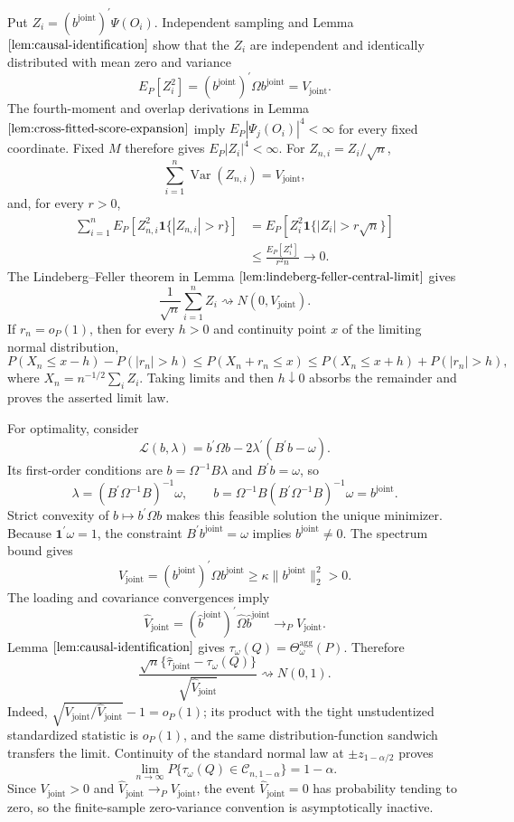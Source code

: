 Put \(Z_i=(b^{\mathrm{joint}})^{\prime}\Psi(O_i)\). Independent sampling and Lemma \(\ref{lem:causal-identification}\) show that the \(Z_i\) are independent and identically distributed with mean zero and variance
\[
 E_P[Z_i^2]=(b^{\mathrm{joint}})^{\prime}\Omega
 b^{\mathrm{joint}}=V_{\mathrm{joint}}.
\]
The fourth-moment and overlap derivations in Lemma \(\ref{lem:cross-fitted-score-expansion}\) imply \(E_P|\Psi_j(O_i)|^4<\infty\) for every fixed coordinate. Fixed \(M\) therefore gives \(E_P|Z_i|^4<\infty\). For \(Z_{n,i}=Z_i/\sqrt n\),
\[
 \sum_{i=1}^n\operatorname{Var}(Z_{n,i})=V_{\mathrm{joint}},
\]
and, for every \(r>0\),
\[
\begin{aligned}
 \sum_{i=1}^nE_P[Z_{n,i}^2\mathbf 1\{|Z_{n,i}|>r\}]
 &=E_P[Z_i^2\mathbf 1\{|Z_i|>r\sqrt n\}]\\
 &\le \frac{E_P[Z_i^4]}{r^2n}\longrightarrow0.
\end{aligned}
\]
The Lindeberg--Feller theorem in Lemma \(\ref{lem:lindeberg-feller-central-limit}\) gives
\[
 \frac1{\sqrt n}\sum_{i=1}^nZ_i
 \rightsquigarrow N(0,V_{\mathrm{joint}}).
\]
If \(r_n=o_P(1)\), then for every \(h>0\) and continuity point \(x\) of the limiting normal distribution,
\[
 P(X_n\le x-h)-P(|r_n|>h)
 \le P(X_n+r_n\le x)
 \le P(X_n\le x+h)+P(|r_n|>h),
\]
where \(X_n=n^{-1/2}\sum_iZ_i\). Taking limits and then \(h\downarrow0\) absorbs the remainder and proves the asserted limit law.

For optimality, consider
\[
 \mathcal L(b,\lambda)=b^{\prime}\Omega b
 -2\lambda^{\prime}(B^{\prime}b-\omega).
\]
Its first-order conditions are \(b=\Omega^{-1}B\lambda\) and \(B^{\prime}b=\omega\), so
\[
 \lambda=(B^{\prime}\Omega^{-1}B)^{-1}\omega,
 \qquad
 b=\Omega^{-1}B(B^{\prime}\Omega^{-1}B)^{-1}\omega
 =b^{\mathrm{joint}}.
\]
Strict convexity of \(b\mapsto b^{\prime}\Omega b\) makes this feasible solution the unique minimizer. Because \(\mathbf 1^{\prime}\omega=1\), the constraint \(B^{\prime}b^{\mathrm{joint}}=\omega\) implies \(b^{\mathrm{joint}}\ne0\). The spectrum bound gives
\[
 V_{\mathrm{joint}}
 =(b^{\mathrm{joint}})^{\prime}\Omega b^{\mathrm{joint}}
 \ge\kappa\|b^{\mathrm{joint}}\|_2^2>0.
\]
The loading and covariance convergences imply
\[
 \widehat V_{\mathrm{joint}}
 =(\widehat b^{\mathrm{joint}})^{\prime}
 \widehat\Omega\widehat b^{\mathrm{joint}}
 \to_PV_{\mathrm{joint}}.
\]
Lemma \(\ref{lem:causal-identification}\) gives \(\tau_\omega(Q)=\Theta_\omega^{\mathrm{agg}}(P)\). Therefore
\[
 \frac{\sqrt n\{\widehat\tau_{\mathrm{joint}}-\tau_\omega(Q)\}}
 {\sqrt{\widehat V_{\mathrm{joint}}}}
 \rightsquigarrow N(0,1).
\]
Indeed, \(\sqrt{V_{\mathrm{joint}}/\widehat V_{\mathrm{joint}}}-1=o_P(1)\); its product with the tight unstudentized standardized statistic is \(o_P(1)\), and the same distribution-function sandwich transfers the limit. Continuity of the standard normal law at \(\pm z_{1-\alpha/2}\) proves
\[
 \lim_{n\to\infty}P\{\tau_\omega(Q)\in\mathcal C_{n,1-\alpha}\}
 =1-\alpha.
\]
Since \(V_{\mathrm{joint}}>0\) and \(\widehat V_{\mathrm{joint}}\to_PV_{\mathrm{joint}}\), the event \(\widehat V_{\mathrm{joint}}=0\) has probability tending to zero, so the finite-sample zero-variance convention is asymptotically inactive.

